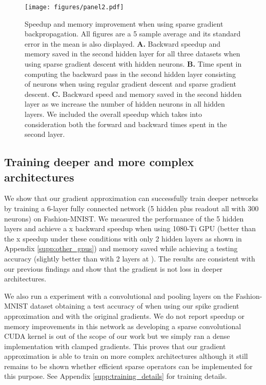 \documentclass{article}
\begin{document}
\begin{figure}[!tb]
\centering
\texttt{[image: figures/panel2.pdf]}
\caption{Speedup and memory improvement when using sparse gradient backpropagation. All figures are a 5 sample average and its standard error in the mean is also displayed.
\textbf{A.} Backward speedup and memory saved in the second hidden layer for all three datasets when using sparse gradient descent with  hidden neurons. \textbf{B.} Time spent in computing the backward pass in the second hidden layer consisting of  neurons when using regular gradient descent and sparse gradient descent. \textbf{C.} Backward speed and memory saved in the second hidden layer as we increase the number of hidden neurons in all hidden layers. We included the overall speedup which takes into consideration both the forward and backward times spent in the second layer.}
\label{fig:panel2}
\end{figure}

\subsection{Training deeper and more complex architectures}

We show that our gradient approximation can successfully train deeper networks by training a 6-layer fully connected network (5 hidden plus readout all with 300 neurons) on Fashion-MNIST. We measured the performance of the 5 hidden layers and achieve a x backward speedup when using 1080-Ti GPU (better than the x speedup under these conditions with only 2 hidden layers as shown in Appendix \ref{supp:other_gpus}) and  memory saved while achieving a  testing accuracy (slightly better than with 2 layers at ). The results are consistent with our previous findings and show that the gradient is not loss in deeper architectures.

We also run a experiment with a convolutional and pooling layers on the Fashion-MNIST dataset obtaining a test accuracy of  when using our spike gradient approximation and  with the original gradients. We do not report speedup or memory improvements in this network as developing a sparse convolutional CUDA kernel is out of the scope of our work but we simply ran a dense implementation with clamped gradients. This proves that our gradient approximation is able to train on more complex architectures although it still remains to be shown whether efficient sparse operators can be implemented for this purpose. See Appendix \ref{supp:training_details} for training details.
\end{document}
